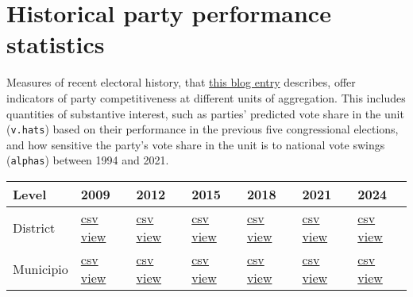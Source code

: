 \documentclass[11pt]{article}
\begin{document}
\section{Historical party performance statistics}
\label{sec:org2e85bcf}
Measures of recent electoral history, that \href{https://emagar.github.io/residuales-2018-english/}{this blog entry} describes, offer indicators of party competitiveness at different units of aggregation. This includes quantities of substantive interest, such as parties' predicted vote share in the unit (\texttt{v.hats}) based on their performance in the previous five congressional elections, and how sensitive the party's vote share in the unit is to national vote swings (\texttt{alphas}) between 1994 and 2021.
\begin{center}
\begin{tabular}{lllllll}
Level & 2009 & 2012 & 2015 & 2018 & 2021 & 2024\\
\hline
District & \href{./data/v-hats-etc/dis/dipfed-distrito-vhat-2009.csv}{csv} \href{https://docs.google.com/spreadsheets/d/1E9hffMdeTqOG5V8z7YEwCRRvazpYaj5HSa5xqOn4WJs/copy}{view} & \href{./data/v-hats-etc/dis/dipfed-distrito-vhat-2012.csv}{csv} \href{https://docs.google.com/spreadsheets/d/1vze9n0HwIw8RC68Ie6lRB1x-pgg0purapbF04iywKdc/copy}{view} & \href{./data/v-hats-etc/dis/dipfed-distrito-vhat-2015.csv}{csv} \href{https://docs.google.com/spreadsheets/d/1YM8g\_tmfNtnyJQva6N6HH6NnLa2Si40amO9di40lw8c/copy}{view} & \href{./data/v-hats-etc/dis/dipfed-distrito-vhat-2018.csv}{csv} \href{https://docs.google.com/spreadsheets/d/1xP4ABf7VvSLefRRyScdBxVGarWOr\_hYZK956hIPZkIY/copy}{view} & \href{./data/v-hats-etc/dis/dipfed-distrito-vhat-2021.csv}{csv} \href{https://docs.google.com/spreadsheets/d/1Oce9stn05v9M-T8YusF2d7nPxy3J8\_OqRVdiDnOI9mQ/copy}{view} & \href{./data/v-hats-etc/dis/dipfed-distrito-vhat-2024.csv}{csv} \href{https://docs.google.com/spreadsheets/d/1p-EH1pahzgoMgF6yVpFp-\_L6Byma0ZmBUfi0e1zanl0/copy}{view}\\
Municipio & \href{./data/v-hats-etc/mun/dipfed-municipio-vhat-2009.csv}{csv} \href{https://docs.google.com/spreadsheets/d/1Y3VipbSzmhbfWUXBnNVHGS8mDjHxaEW1lYoccQ9tr48/copy}{view} & \href{./data/v-hats-etc/mun/dipfed-municipio-vhat-2012.csv}{csv} \href{https://docs.google.com/spreadsheets/d/1LwuFkzPVLVwL2kkOEBBz54g7ZDM6RMJ4mlQv7awIDtg/copy}{view} & \href{./data/v-hats-etc/mun/dipfed-municipio-vhat-2015.csv}{csv} \href{https://docs.google.com/spreadsheets/d/18XlMxG4HN\_vrDdyPYtqJbQXKpM-1LR5MVq598Any2nw/copy}{view} & \href{./data/v-hats-etc/mun/dipfed-municipio-vhat-2018.csv}{csv} \href{https://docs.google.com/spreadsheets/d/1L9SeCXUpHkhk4K1Xagv34Z65i8WvmW9E-ApeNB36\_v4/copy}{view} & \href{./data/v-hats-etc/mun/dipfed-municipio-vhat-2021.csv}{csv} \href{https://docs.google.com/spreadsheets/d/14vSmGXfQc5BXvZ32nKAVyaQdDV1dz6cXgL1MGMxxt94/copy}{view} & \href{./data/v-hats-etc/mun/dipfed-municipio-vhat-2024.csv}{csv} \href{https://docs.google.com/spreadsheets/d/13FnRerpuxIM-RZfgzkjUiPXKPKL1JACkBIk0oa2kSfI/copy}{view}\\

\end{tabular}
\end{center}
\end{document}
